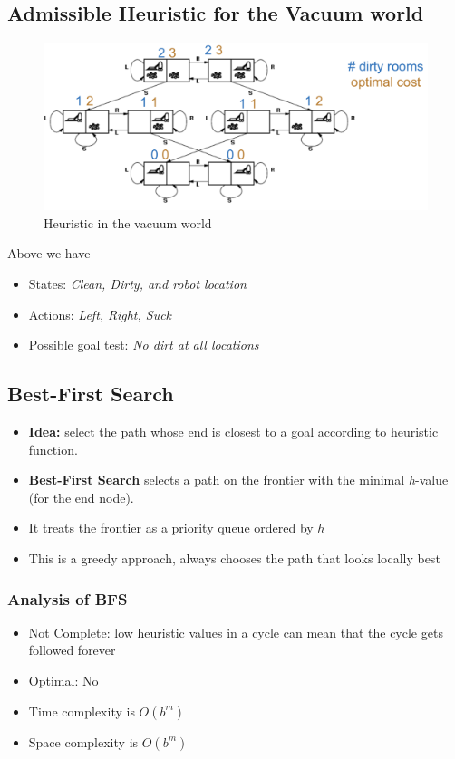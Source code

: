 \documentclass{article}
\theoremstyle{definition}
\begin{document}
 \subsection*{Admissible Heuristic for the Vacuum world}
 \begin{figure}[H]
 	\centering
 	\includegraphics[width = 5in]{Pic1}
 	\caption{Heuristic in the vacuum world}
 \end{figure}
Above we have
\begin{itemize}
	\item States: \textit{Clean, Dirty, and robot location}
	\item Actions: \textit{Left, Right, Suck}
	\item Possible goal test: \textit{No dirt at all locations}
\end{itemize}

\subsection*{Best-First Search}
\begin{itemize}
	\item {\color{blue} \textbf{Idea:}} select the path whose end is closest to a goal according to heuristic function. 
	\item \textbf{Best-First Search} selects a path on the frontier with the minimal \textit{h}-value (for the end node).
	\item It treats the frontier {\color{blue} as a priority queue ordered by $ h $}
	\item This is a greedy approach, always chooses the path that looks locally best
\end{itemize}
\subsubsection*{Analysis of BFS}
\begin{itemize}
	\item {\color{blue} Not Complete}: low heuristic values in a cycle can mean that the cycle gets followed forever
	\item {\color{blue} Optimal}: No
	\item {\color{blue} Time complexity} is $ O(b^m) $
	\item {\color{blue} Space complexity} is $ O(b^m) $
\end{itemize}
\end{document}
